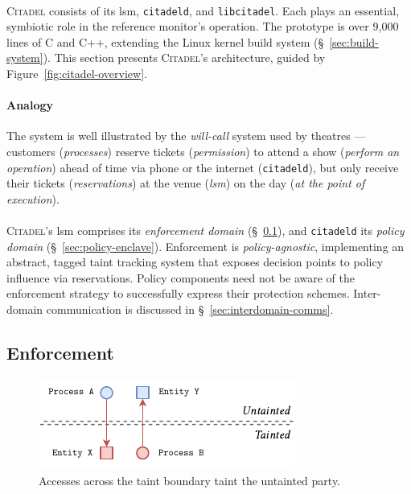\paragraph{} \textsc{Citadel} consists of its \acrshort{lsm}, \texttt{citadeld}, and \texttt{libcitadel}. Each plays an essential, symbiotic role in the reference monitor's operation. The prototype is over 9,000 lines of C and C++, extending the Linux kernel build system (§~\ref{sec:build-system}). This section presents \textsc{Citadel}'s architecture, guided by Figure~\ref{fig:citadel-overview}.

\paragraph{Analogy} The system is well illustrated by the \textit{will-call} system used by theatres --- customers (\textit{processes}) reserve tickets (\textit{permission}) to attend a show (\textit{perform an operation}) ahead of time via phone or the internet (\texttt{citadeld}), but only receive their tickets (\textit{reservations}) at the venue (\textit{\acrshort{lsm}}) on the day (\textit{at the point of execution}).

\paragraph{} \textsc{Citadel}'s \acrshort{lsm} comprises its \textit{enforcement domain} (§~\ref{sec:enforcement-domain}), and \texttt{citadeld} its \textit{policy domain} (§~\ref{sec:policy-enclave}). Enforcement is \textit{policy-agnostic}, implementing an abstract, tagged taint tracking system that exposes decision points to policy influence via reservations. Policy components need not be aware of the enforcement strategy to successfully express their protection schemes. Inter-domain communication is discussed in §~\ref{sec:interdomain-comms}.



\subsection{Enforcement}
\label{sec:enforcement-domain}

\begin{figure}[]
    \centering
    \includegraphics[width=0.55\linewidth]{figures/CitadelTaint.pdf}
    \caption[Accesses across the taint boundary]{Accesses across the taint boundary taint the untainted party.}
    \label{fig:taint-boundary}
\end{figure}

